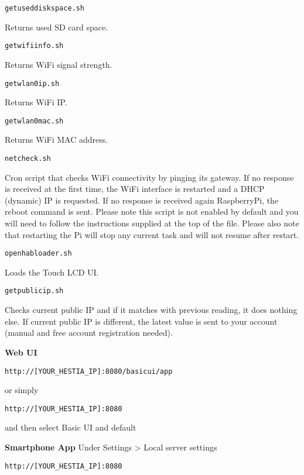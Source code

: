 \texttt{getuseddiskspace.sh}

Returns used SD card space.

\texttt{getwifiinfo.sh }

Returns WiFi signal strength.

\texttt{getwlan0ip.sh }

Returns WiFi IP.

\texttt{getwlan0mac.sh }

Returns WiFi MAC address.

\texttt{netcheck.sh }

Cron script that checks WiFi connectivity by pinging its gateway. If no
response is received at the first time, the WiFi interface is restarted and a
DHCP (dynamic) IP is requested. If no response is received again RaspberryPi,
the reboot command is sent. Please note this script is not enabled by default
and you will need to follow the instructions supplied at the top of the file.
Please also note that restarting the Pi will stop any current task and will not
resume after restart.

\texttt{openhabloader.sh }

Loads the Touch LCD UI.

\texttt{getpublicip.sh }

Checks current public IP and if it matches with previous reading, it does
nothing else. If current public IP is different, the latest value is sent to
your account (manual and free account registration needed).
    
\textbf{Web UI}

\texttt{http://[YOUR\_HESTIA\_IP]:8080/basicui/app}

or simply


\texttt{http://[YOUR\_HESTIA\_IP]:8080}

and then select Basic UI and default

\textbf{Smartphone App}
Under Settings > Local server settings


\texttt{http://[YOUR\_HESTIA\_IP]:8080}
